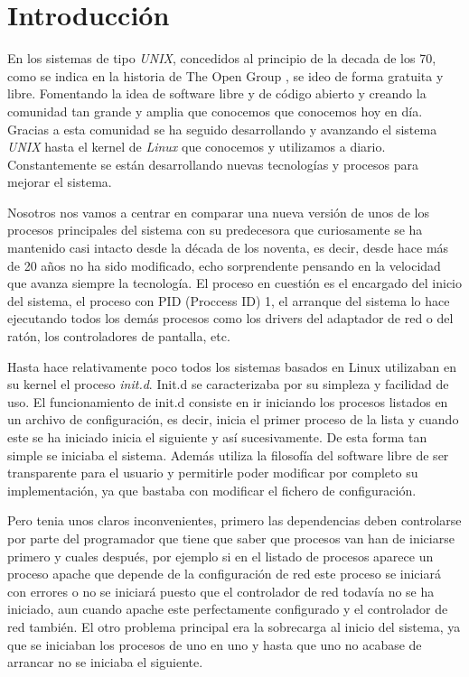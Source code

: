 \section{Introducción} %
En los sistemas de tipo \textit{UNIX}, concedidos al principio de la decada
de los 70, como se indica en la historia de The Open Group \cite{unix}, 
se ideo de forma gratuita y libre. Fomentando la idea de software libre
y de código abierto y creando la comunidad tan grande y amplia que conocemos 
que conocemos hoy en día. Gracias a esta comunidad se ha seguido
desarrollando y avanzando el sistema \textit{UNIX} hasta el kernel de 
\textit{Linux} que conocemos y utilizamos a diario. Constantemente se están
desarrollando nuevas tecnologías y procesos para mejorar el sistema.

Nosotros nos vamos a centrar en comparar una nueva versión de unos de los procesos principales del sistema con su predecesora que curiosamente se ha
 mantenido casi intacto 
desde la década de los noventa, es decir, desde hace más de 20 años no
ha sido modificado, echo sorprendente pensando en la velocidad que avanza
siempre la tecnología. El proceso en cuestión es el encargado del inicio 
del sistema, el proceso con PID (Proccess ID) 1, el arranque del sistema 
lo hace ejecutando todos los demás procesos como los drivers del adaptador
de red o del ratón, los controladores de pantalla, etc. 

Hasta hace relativamente poco todos los sistemas basados en Linux 
utilizaban en su kernel el proceso \textit{init.d}. Init.d se caracterizaba
por su simpleza y facilidad de uso. El funcionamiento de init.d consiste
en ir iniciando los procesos listados en un archivo de configuración, 
es decir, inicia el primer proceso de la lista y cuando este se ha iniciado
inicia el siguiente y así sucesivamente. De esta forma tan simple se
iniciaba el sistema. Además utiliza la filosofía del software libre de 
ser transparente para el usuario y permitirle poder modificar por completo
su implementación, ya que bastaba con modificar el fichero de configuración.

Pero tenia unos claros inconvenientes, primero las dependencias
deben controlarse por parte del programador que tiene que saber que procesos
van han de iniciarse primero y cuales después, por ejemplo si en el listado
de procesos aparece un proceso apache que depende de la configuración de
red este proceso se iniciará con errores o no se iniciará puesto que el 
controlador de red todavía no se ha iniciado, aun cuando apache este 
perfectamente configurado y el controlador de red también. El otro
problema principal era la sobrecarga al inicio del sistema, ya que se 
iniciaban los procesos de uno en uno y hasta que uno no acabase de arrancar
no se iniciaba el siguiente.

